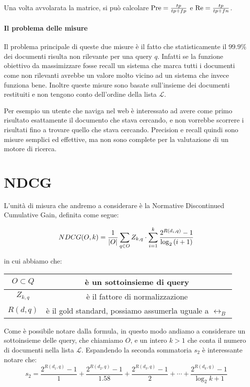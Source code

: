 Una volta avvolarata la matrice, si può calcolare $\text{Pre} = \frac{tp}{tp + fp}$ e $\text{Re} = \frac{tp}{tp + fn}$.

\paragraph{Il problema delle misure}
Il problema principale di queste due misure è il fatto che statisticamente il $99.9\%$ dei documenti
risulta non rilevante per una query $q$. 
Infatti se la funzione obiettivo da massimizzare fosse recall
un sistema che marca tutti i documenti come non rilevanti avrebbe
un valore molto vicino ad un sistema che invece funziona bene. Inoltre
queste misure sono basate sull'insieme dei documenti restituiti e non tengono
conto dell'ordine della lista $\mathcal{L}$.

Per esempio un utente che naviga nel web è interessato
ad avere come primo risultato esattamente il documento che stava cercando,
e non vorrebbe scorrere i risultati fino a trovare quello che stava cercando.
Precision e recall quindi sono misure semplici ed effettive, ma non sono
complete per la valutazione di un motore di ricerca.

\section{NDCG}
L'unità di misura che andremo a considerare è la Normative Discontinued Cumulative Gain,
definita come segue:

$$\label{def:ndcg}
NDCG(O, k) = \frac{1}{\left|O\right|} \sum_{q \in O} Z_{k, q} \cdot \sum_{i=1}^{k} \frac{2^{R(d_i, q)} - 1}{\log_2{(i + 1)}} \\
$$

in cui abbiamo che:
\begin{table}[h!]
	\centering
	\begin{tabular}{|c|c|}
		\hline
		$ O \subset Q$ & è un sottoinsieme di query \\
		\hline
		$Z_{k,q}$ & è il fattore di normalizzazione \\
		\hline
		$R(d,q)$ & è il gold standard, possiamo assumerla uguale a $\rel_B$ \\
		\hline
	\end{tabular}
\end{table}


Come è possibile notare dalla formula, in questo modo andiamo a considerare un sottoinsieme delle query, che chiamiamo $O$,
e un intero $k>1$ che conta il numero di documenti nella lista $\mathcal{L}$.
Espandendo la seconda sommatoria $s_2$ è interessante notare che:
$$
s_2 = \frac{2^{R(d_1, q) } - 1}{1} + \frac{2^{R(d_2, q)} - 1}{1.58} + \frac{2^{R(d_3, q)} - 1}{2} + \dotsb + \frac{2^{R(d_k, q) } - 1}{\log_2{k + 1}}
$$

